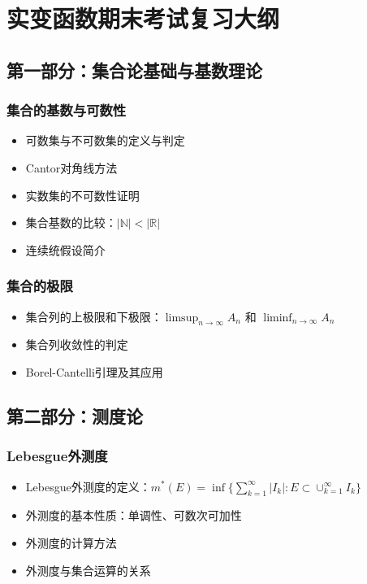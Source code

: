\section{实变函数期末考试复习大纲}

\subsection{第一部分：集合论基础与基数理论}

\subsubsection{集合的基数与可数性}
\begin{itemize}
    \item 可数集与不可数集的定义与判定
    \item Cantor对角线方法
    \item 实数集的不可数性证明
    \item 集合基数的比较：$|\mathbb{N}| < |\mathbb{R}|$
    \item 连续统假设简介
\end{itemize}

\subsubsection{集合的极限}
\begin{itemize}
    \item 集合列的上极限和下极限：$\limsup_{n \to \infty} A_n$ 和 $\liminf_{n \to \infty} A_n$
    \item 集合列收敛性的判定
    \item Borel-Cantelli引理及其应用
\end{itemize}

\subsection{第二部分：测度论}

\subsubsection{Lebesgue外测度}
\begin{itemize}
    \item Lebesgue外测度的定义：$m^*(E) = \inf\{\sum_{k=1}^{\infty}|I_k| : E \subset \cup_{k=1}^{\infty} I_k\}$
    \item 外测度的基本性质：单调性、可数次可加性
    \item 外测度的计算方法
    \item 外测度与集合运算的关系
\end{itemize}


